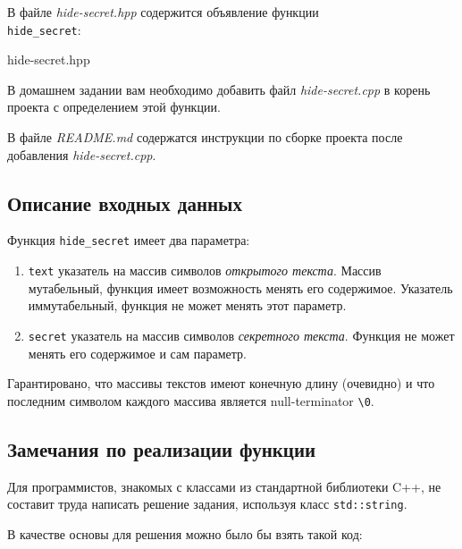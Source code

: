 \documentclass[14pt]{extarticle}
\begin{document}
        В файле \textit{hide-secret.hpp} содержится объявление функции \\ \texttt{hide\_secret}:

            {hide-secret.hpp}

        В домашнем задании вам необходимо добавить файл \textit{hide-secret.cpp} в корень
        проекта с определением этой функции.

        В файле \textit{README.md} содержатся инструкции по сборке проекта после добавления
        \textit{hide-secret.cpp}.

    \subsection{Описание входных данных}

        Функция \texttt{hide\_secret} имеет два параметра:

        \begin{enumerate}

            \item \texttt{text} \textemdash \space указатель на массив символов
                \textit{открытого текста}.
                Массив мутабельный, функция имеет возможность менять его содержимое.
                Указатель иммутабельный, функция не может менять этот параметр.

            \item \texttt{secret} \textemdash \space указатель на массив символов
                \textit{секретного текста}.
                Функция не может менять его содержимое и сам параметр.

        \end{enumerate}
        
        Гарантировано, что массивы текстов имеют конечную длину (очевидно) и что
        последним символом каждого массива является null-terminator \verb|\0|.

    \subsection{Замечания по реализации функции} \label{stdstring}

        Для программистов, знакомых с классами из стандартной библиотеки C++,
        не составит труда написать решение задания, используя класс \texttt{std::string}.

        В качестве основы для решения можно было бы взять такой код:
\end{document}
